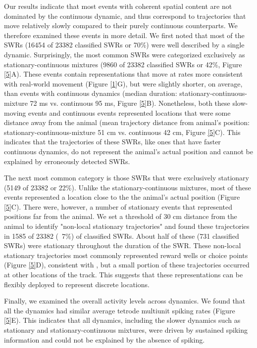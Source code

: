 \documentclass[times, twoside]{zHenriquesLab-StyleBioRxiv}
\begin{document}
Our results indicate that most events with coherent spatial content are not dominated by the continuous dynamic, and thus correspond to trajectories that move relatively slowly compared to their purely continuous counterparts. We therefore examined these events in more detail. We first noted that most of the SWRs (16454 of 23382 classified SWRs or 70\%) were well described by a single dynamic. Surprisingly, the most common SWRs were categorized exclusively as stationary-continuous mixtures (9860 of 23382 classified SWRs or 42\%, Figure \ref{5}A). These events contain representations that move at rates more consistent with real-world movement (Figure \ref{1}G), but were slightly shorter, on average, than events with continuous dynamics (median duration: stationary-continuous-mixture 72 ms vs. continuous 95 ms, Figure \ref{5}B). Nonetheless, both these slow-moving events and continuous events represented locations that were some distance away from the animal (mean trajectory distance from animal's position: stationary-continuous-mixture 51 cm vs. continuous 42 cm, Figure \ref{5}C). This indicates that the trajectories of these SWRs, like ones that have faster continuous dynamics, do not represent the animal's actual position and cannot be explained by erroneously detected SWRs.

The next most common category is those SWRs that were exclusively stationary (5149 of 23382 or 22\%). Unlike the stationary-continuous mixtures, most of these events represented a location close to the the animal's actual position (Figure \ref{5}C). There were, however, a number of stationary events  that represented positions far from the animal. We set a threshold of 30 cm distance from the animal to identify "non-local stationary trajectories" and found these trajectories in 1585 of 23382 (~7\%) of classified SWRs. About half of these (731 classified SWRs) were stationary throughout the duration of the SWR. These non-local stationary trajectories most commonly represented reward wells or choice points (Figure \ref{5}D), consistent with \cite{JaiDistincthippocampalcorticalmemory2017}, but a small portion of these trajectories occurred at other locations of the track. This suggests that these representations can be flexibly deployed to represent discrete locations.

Finally, we examined the overall activity levels across dynamics. We found that all the dynamics had similar average tetrode multiunit spiking rates (Figure \ref{5}E). This indicates that all dynamics, including the slower dynamics such as stationary and stationary-continuous mixtures, were driven by sustained spiking information and could not be explained by the absence of spiking.
\end{document}
